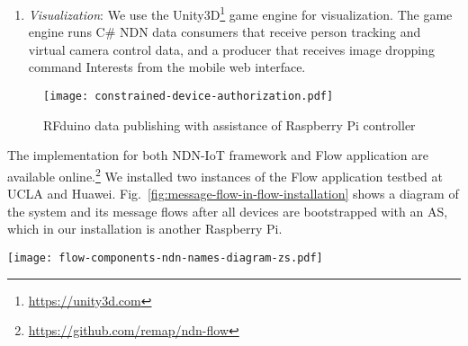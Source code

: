 \begin{enumerate}
\item \textit{Visualization}: We use the Unity3D\footnote{\url{https://unity3d.com}} game engine for visualization.
The game engine runs C\# NDN data consumers that receive person tracking and virtual camera control data, and a producer that receives image dropping command Interests from the mobile web interface.
\end{enumerate}

\begin{figure}[!t]
\centering
\texttt{[image: constrained-device-authorization.pdf]}
\caption{RFduino data publishing with assistance of Raspberry Pi controller}
\label{fig:contrained-devices-bootstrap}
\end{figure}

The implementation for both NDN-IoT framework and Flow application are available online.\footnote{\url{https://github.com/remap/ndn-flow}} We installed two instances of the Flow application testbed at UCLA and Huawei. Fig.~\ref{fig:message-flow-in-flow-installation} shows a diagram of the system and its message flows after all devices are bootstrapped with an AS, which in our installation is another Raspberry Pi.

\begin{figure*}[!t]
\centering
\texttt{[image: flow-components-ndn-names-diagram-zs.pdf]}
\caption{Application components and message flows in Flow}
\label{fig:message-flow-in-flow-installation}
\end{figure*}
